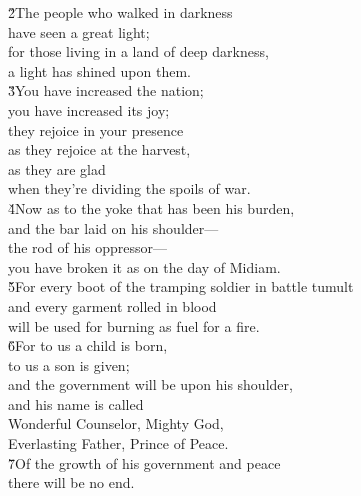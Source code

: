\begin{poetry}
\poeml \v{2}The people who walked in darkness \\
\poemll    have seen a great light; \\
\poeml for those living in a land of deep darkness, \\
\poemll    a light has shined upon them. \\
\poeml \v{3}You have increased the nation; \\
\poemll    you have increased its joy; \\
\poeml they rejoice in your presence \\
\poemll    as they rejoice at the harvest, \\
\poeml as they are glad \\
\poemll    when they're dividing the spoils of war. \\
\poeml \v{4}Now as to the yoke that has been his burden, \\
\poemll    and the bar laid on his shoulder--- \\
\poeml the rod of his oppressor--- \\
\poemll    you have broken it as on the day of Midiam. \\
\poeml \v{5}For every boot of the tramping soldier in battle tumult \\
\poemll    and every garment rolled in blood \\
\poemlll       will be used for burning as fuel for a fire. \\
\poeml \v{6}For to us a child is born, \\
\poemll    to us a son is given; \\
\poeml and the government will be upon his shoulder, \\
\poemll    and his name is called \\
\poeml Wonderful Counselor, Mighty God, \\
\poeml Everlasting Father, Prince of Peace. \\
\poeml \v{7}Of the growth of his government and peace \\
\poemll    there will be no end. \\

\end{poetry}
